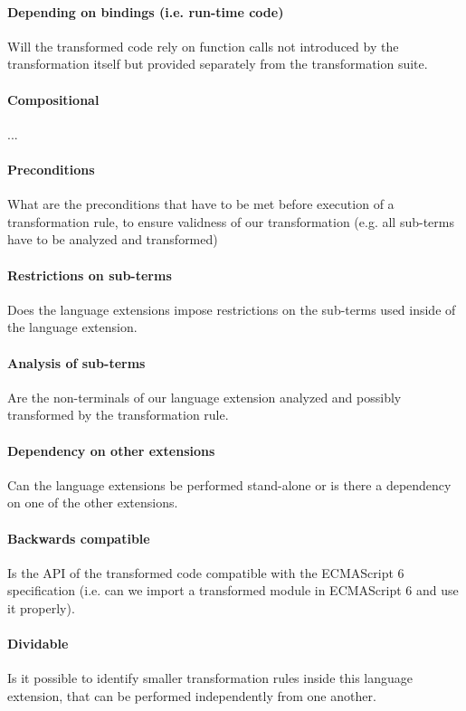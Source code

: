 \paragraph{Depending on bindings (i.e. run-time code)}
Will the transformed code rely on function calls not introduced by the transformation itself but provided separately from the transformation suite.

\paragraph{Compositional}
...

\paragraph{Preconditions}
What are the preconditions that have to be met before execution of a transformation rule, to ensure validness of our transformation (e.g. all sub-terms have to be analyzed and transformed)

\paragraph{Restrictions on sub-terms}
Does the language extensions impose restrictions on the sub-terms used inside of the language extension. 

\paragraph{Analysis of sub-terms}
Are the non-terminals of our language extension analyzed and possibly transformed by the transformation rule.

\paragraph{Dependency on other extensions}
Can the language extensions be performed stand-alone or is there a dependency on one of the other extensions.

\paragraph{Backwards compatible}
Is the API of the transformed code compatible with the ECMAScript 6 specification (i.e. can we import a transformed module in ECMAScript 6 and use it properly).

\paragraph{Dividable}
Is it possible to identify smaller transformation rules inside this language extension, that can be performed independently from one another.


